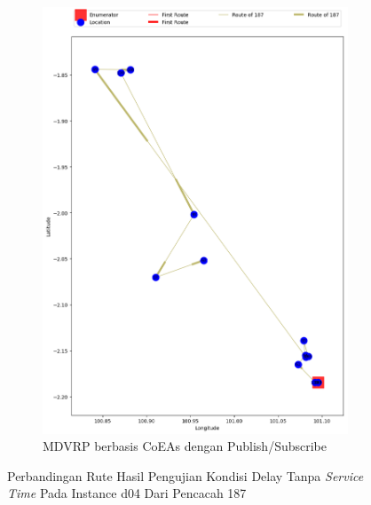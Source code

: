 \begin{figure}[H]\ContinuedFloat
	\centering
	\begin{subfigure}[t]{\textwidth}
		\centering
		\includegraphics[width=\textwidth]{Resources/Images/delayed_4/real_m15_n100_delayed_4_187_pubsub_coes}
		\caption{MDVRP berbasis CoEAs dengan Publish/Subscribe}
		\label{fig:real_m15_n100_delayed_4_187_pubsub_coes}
	\end{subfigure}
	\caption{Perbandingan Rute Hasil Pengujian Kondisi Delay Tanpa \textit{Service Time} Pada Instance d04 Dari Pencacah 187}
	\label{fig:real_m15_n100_delayed_4_187_contd}
\end{figure}


